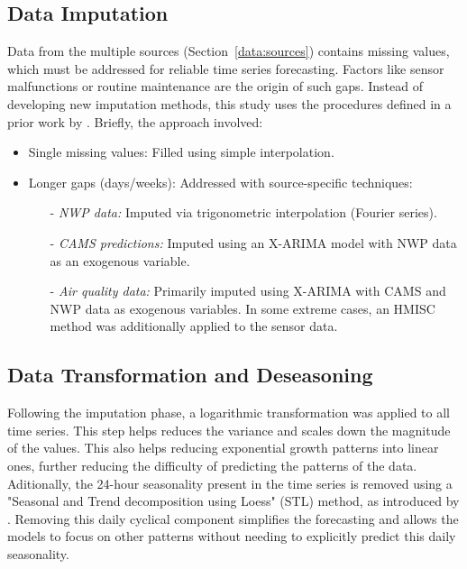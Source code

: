 \documentclass[12pt,a4paper]{book}
\begin{document}
\subsection{Data Imputation}
Data from the multiple sources (Section~\ref{data:sources}) contains missing values, which must be addressed for reliable time series forecasting. Factors like sensor malfunctions or routine maintenance \citep{wardana_estimation_2022} are the origin of such gaps. Instead of developing new imputation methods, this study uses the procedures defined in a prior work by \citet{de_medrano_socaire_2021}. Briefly, the approach involved:
\begin{itemize}
    \item Single missing values: Filled using simple interpolation.
    \item Longer gaps (days/weeks): Addressed with source-specific techniques:
    \begin{itemize}
        \item[-] \textit{NWP data:} Imputed via trigonometric interpolation (Fourier series).
        \item[-] \textit{CAMS predictions:} Imputed using an X-ARIMA model with NWP data as an exogenous variable.
        \item[-] \textit{Air quality data:} Primarily imputed using X-ARIMA with CAMS and NWP data as exogenous variables. In some extreme cases, an HMISC method was additionally applied to the sensor data.
    \end{itemize}
\end{itemize}

\subsection{Data Transformation and Deseasoning}
Following the imputation phase, a logarithmic transformation was applied to all time series. This step helps reduces the variance and scales down the magnitude of the values. This also helps reducing exponential growth patterns into linear ones, further reducing the difficulty of predicting the patterns of the data. Aditionally, the 24-hour seasonality present in the time series is removed using a "Seasonal and Trend decomposition using Loess" (STL) method, as introduced by \citet{cleveland1990stl}. Removing this daily cyclical component simplifies the forecasting and allows the models to focus on other patterns without needing to explicitly predict this daily seasonality.
\end{document}
